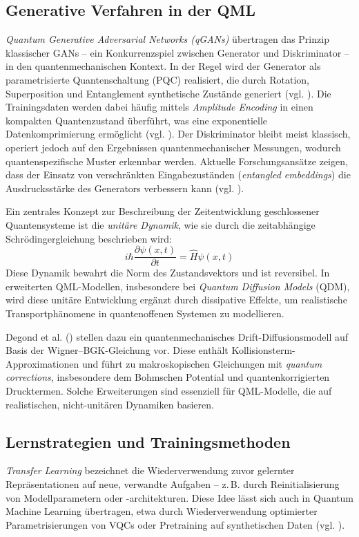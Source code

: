 \subsection{Generative Verfahren in der QML}  
\textit{Quantum Generative Adversarial Networks (qGANs)}  übertragen das Prinzip klassischer GANs – ein Konkurrenzspiel zwischen Generator und Diskriminator – in den quantenmechanischen Kontext. In der Regel wird der Generator als parametrisierte Quantenschaltung (PQC) realisiert, die durch Rotation, Superposition und Entanglement synthetische Zustände generiert (vgl. \cite{zoufal_quantum_2019}). Die Trainingsdaten werden dabei häufig mittels \textit{Amplitude Encoding} in einen kompakten Quantenzustand überführt, was eine exponentielle Datenkomprimierung ermöglicht (vgl. \cite{schuld_supervised_2018}). Der Diskriminator bleibt meist klassisch, operiert jedoch auf den Ergebnissen quantenmechanischer Messungen, wodurch quantenspezifische Muster erkennbar werden. Aktuelle Forschungsansätze zeigen, dass der Einsatz von verschränkten Eingabezuständen (\textit{entangled embeddings}) die Ausdrucksstärke des Generators verbessern kann (vgl. \cite{niu_entangling_2022}).
\vspace{0.3cm}

Ein zentrales Konzept zur Beschreibung der Zeitentwicklung geschlossener Quantensysteme ist die \textit{unitäre Dynamik}, wie sie durch die zeitabhängige Schrödingergleichung beschrieben wird:
\[
i\hbar \frac{\partial \psi(x, t)}{\partial t} = \hat{H} \psi(x, t)
\]
Diese Dynamik bewahrt die Norm des Zustandsvektors und ist reversibel. In erweiterten QML-Modellen, insbesondere bei \textit{Quantum Diffusion Models} (QDM), wird diese unitäre Entwicklung ergänzt durch dissipative Effekte, um realistische Transportphänomene in quantenoffenen Systemen zu modellieren. 

Degond et al. (\cite{degond_quantum_2005}) stellen dazu ein quantenmechanisches Drift-Diffusionsmodell auf Basis der Wigner–BGK-Gleichung vor. Diese enthält Kollisionsterm-Approximationen und führt zu makroskopischen Gleichungen mit \textit{quantum corrections}, insbesondere dem Bohmschen Potential und quantenkorrigierten Drucktermen. Solche Erweiterungen sind essenziell für QML-Modelle, die auf realistischen, nicht-unitären Dynamiken basieren.


\subsection{Lernstrategien und Trainingsmethoden}  
\textit{Transfer Learning} bezeichnet die Wiederverwendung zuvor gelernter Repräsentationen auf neue, verwandte Aufgaben – z.\,B. durch Reinitialisierung von Modellparametern oder -architekturen. Diese Idee lässt sich auch in Quantum Machine Learning übertragen, etwa durch Wiederverwendung optimierter Parametrisierungen von VQCs oder Pretraining auf synthetischen Daten (vgl. \cite{liuQuantumTrainRethinkingHybrid2024}).
\vspace{0.3cm}

